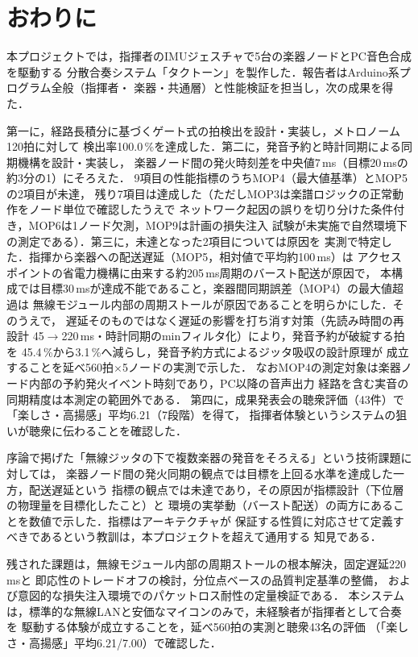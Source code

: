 \documentclass[uplatex,dvipdfmx]{jlreq}
\begin{document}
\section{おわりに}\label{sec:conclusion}

本プロジェクトでは，指揮者のIMUジェスチャで5台の楽器ノードとPC音色合成を駆動する
分散合奏システム「タクトーン」を製作した．報告者はArduino系プログラム全般（指揮者・
楽器・共通層）と性能検証を担当し，次の成果を得た．

第一に，経路長積分に基づくゲート式の拍検出を設計・実装し，メトロノーム120拍に対して
検出率100.0\,\%を達成した．第二に，発音予約と時計同期による同期機構を設計・実装し，
楽器ノード間の発火時刻差を中央値7\,ms（目標20\,msの約3分の1）にそろえた．
9項目の性能指標のうちMOP4（最大値基準）とMOP5の2項目が未達，
残り7項目は達成した（ただしMOP3は楽譜ロジックの正常動作をノード単位で確認したうえで
ネットワーク起因の誤りを切り分けた条件付き，MOP6は1ノード欠測，MOP9は計画の損失注入
試験が未実施で自然環境下の測定である）．第三に，未達となった2項目については原因を
実測で特定した．指揮から楽器への配送遅延（MOP5，相対値で平均約100\,ms）は
アクセスポイントの省電力機構に由来する約205\,ms周期のバースト配送が原因で，
本構成では目標30\,msが達成不能であること，楽器間同期誤差（MOP4）の最大値超過は
無線モジュール内部の周期ストールが原因であることを明らかにした．そのうえで，
遅延そのものではなく遅延の影響を打ち消す対策（先読み時間の再設計
45$\to$220\,ms・時計同期のminフィルタ化）により，発音予約が破綻する拍を
45.4\,\%から3.1\,\%へ減らし，発音予約方式によるジッタ吸収の設計原理が
成立することを延べ560拍$\times$5ノードの実測で示した．
なおMOP4の測定対象は楽器ノード内部の予約発火イベント時刻であり，PC以降の音声出力
経路を含む実音の同期精度は本測定の範囲外である．
第四に，成果発表会の聴衆評価（43件）で「楽しさ・高揚感」平均6.21（7段階）を得て，
指揮者体験というシステムの狙いが聴衆に伝わることを確認した．

序論で掲げた「無線ジッタの下で複数楽器の発音をそろえる」という技術課題に対しては，
楽器ノード間の発火同期の観点では目標を上回る水準を達成した一方，配送遅延という
指標の観点では未達であり，その原因が指標設計（下位層の物理量を目標化したこと）と
環境の実挙動（バースト配送）の両方にあることを数値で示した．指標はアーキテクチャが
保証する性質に対応させて定義すべきであるという教訓は，本プロジェクトを超えて通用する
知見である．

残された課題は，無線モジュール内部の周期ストールの根本解決，固定遅延220\,msと
即応性のトレードオフの検討，分位点ベースの品質判定基準の整備，
および意図的な損失注入環境でのパケットロス耐性の定量検証である．
本システムは，標準的な無線LANと安価なマイコンのみで，未経験者が指揮者として合奏を
駆動する体験が成立することを，延べ560拍の実測と聴衆43名の評価
（「楽しさ・高揚感」平均6.21/7.00）で確認した．
\end{document}
